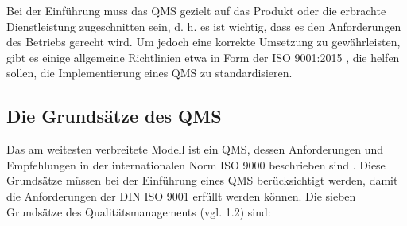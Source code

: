 \documentclass[11pt]{scrartcl}       %
\begin{document}
Bei der Einführung muss das QMS gezielt auf das Produkt oder die erbrachte Dienstleistung zugeschnitten sein, d. h. es ist wichtig, dass es den Anforderungen des Betriebs gerecht wird. Um jedoch eine korrekte Umsetzung zu gewährleisten, gibt es einige allgemeine Richtlinien etwa in Form der ISO 9001:2015 \cite{normungsinstitut2009qualitatsmanagementsysteme}, die helfen sollen, die Implementierung eines QMS zu standardisieren. 

 

\subsection{Die Grundsätze des QMS}

Das am weitesten verbreitete Modell ist ein QMS, dessen Anforderungen
und Empfehlungen in der internationalen Norm ISO 9000 beschrieben sind \cite{sytko2017instrumentation}. Diese Grundsätze müssen bei der Einführung eines QMS berücksichtigt werden, damit die Anforderungen der DIN ISO 9001 erfüllt werden können. Die sieben Grundsätze des Qualitätsmanagements (vgl. \cite{brugger2016din} 1.2) sind:
\end{document}

